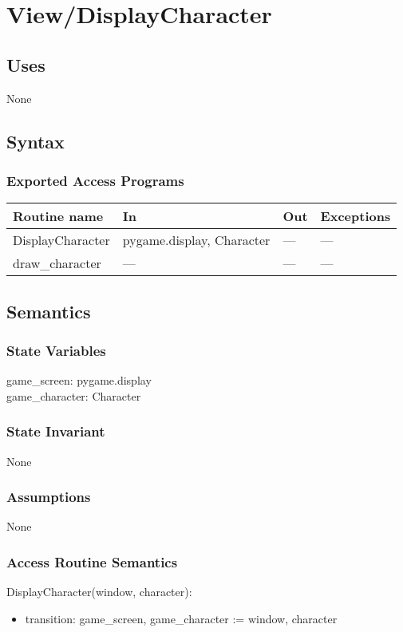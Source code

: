 \documentclass[12pt]{article}
\begin{document}
\section*{View/DisplayCharacter}

\subsection* {Uses}
None
\subsection* {Syntax}

\subsubsection* {Exported Access Programs}

\begin{tabular}{| l | l | l | l |}
\hline
\textbf{Routine name} & \textbf{In} & \textbf{Out} & \textbf{Exceptions}\\
\hline
    DisplayCharacter & pygame.display, Character & --- & ---\\
\hline
    draw\_character & --- & --- & ---\\
\hline
\end{tabular}

\subsection* {Semantics}

\subsubsection* {State Variables}

game\_screen: pygame.display \\
game\_character: Character \\

\subsubsection* {State Invariant}

None

\subsubsection* {Assumptions}

None

\subsubsection* {Access Routine Semantics}
DisplayCharacter(window, character):
\begin{itemize}
    \item transition: game\_screen, game\_character := window, character 
\end{itemize}
\end{document}
